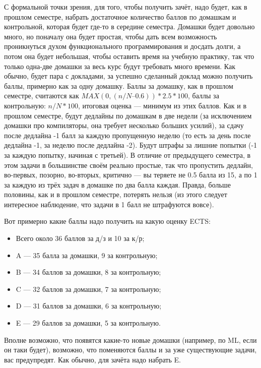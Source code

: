 \documentclass{../../text-style}
\begin{document}
С формальной точки зрения, для того, чтобы получить зачёт, надо будет, как в прошлом семестре, набрать достаточное количество баллов по домашкам и контрольной, которая будет где-то в середине семестра. Домашки будет довольно много, но поначалу она будет простая, чтобы дать всем возможность проникнуться духом функционального программирования и досдать долги, а потом она будет небольшая, чтобы оставить время на учебную практику, так что только одна-две домашки за весь курс будут требовать много времени. Как обычно, будет пара с докладами, за успешно сделанный доклад можно получить баллы, примерно как за одну домашку. Баллы за домашку, как в прошлом семестре, считаются как $MAX(0, (n/N – 0.6)) * 2.5 * 100$, баллы за контрольную: $n/N * 100$, итоговая оценка --- минимум из этих баллов. Как и в прошлом семестре, будут дедлайны по домашкам в две недели (за исключением домашки про компиляторы, она требует несколько больших усилий), за сдачу после дедлайна -1 балл за каждую пропущенную неделю (то есть за день после дедлайна -1, за неделю после дедлайна -2). Будут штрафы за лишние попытки (-1 за каждую попытку, начиная с третьей). В отличие от предыдущего семестра, в этом задачи в большинстве своём реально простые, так что пропустить дедлайн, во-первых, позорно, во-вторых, критично --- вы теряете не 0.5 балла из 15, а по 1 за каждую из трёх задач в домашке по два балла каждая. Правда, больше половины, как и в прошлом семестре, потерять нельзя (из этого следует интересное наблюдение, что задачи в 1 балл не штрафуются вовсе).

Вот примерно какие баллы надо получить на какую оценку ECTS:
\begin{itemize}
    \item Всего около 36 баллов за д/з и 10 за к/р;
    \item A --- 35 балла за домашки, 9 за контрольную;
    \item B --- 34 баллов за домашки, 8 за контрольную;
    \item C --- 32 баллов за домашки, 7 за контрольную;
    \item D --- 31 баллов за домашки, 6 за контрольную;
    \item E --- 29 баллов за домашки, 5 за контрольную.
\end{itemize}

Вполне возможно, что появятся какие-то новые домашки (например, по ML, если он таки будет), возможно, что поменяются баллы и за уже существующие задачи, вас предупредят. Как обычно, для зачёта надо набрать E. 
\end{document}
